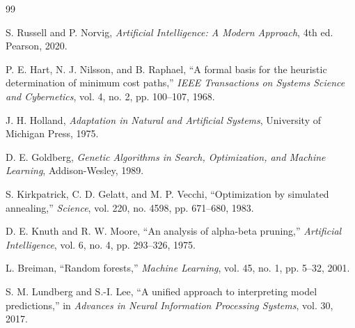\documentclass[12pt,a4paper]{article}
\begin{document}
\begin{thebibliography}{99}

S. Russell and P. Norvig,
\textit{Artificial Intelligence: A Modern Approach},
4th ed. Pearson, 2020.

P. E. Hart, N. J. Nilsson, and B. Raphael,
``A formal basis for the heuristic determination of minimum cost paths,''
\textit{IEEE Transactions on Systems Science and Cybernetics},
vol. 4, no. 2, pp. 100--107, 1968.

J. H. Holland,
\textit{Adaptation in Natural and Artificial Systems},
University of Michigan Press, 1975.

D. E. Goldberg,
\textit{Genetic Algorithms in Search, Optimization, and Machine Learning},
Addison-Wesley, 1989.

S. Kirkpatrick, C. D. Gelatt, and M. P. Vecchi,
``Optimization by simulated annealing,''
\textit{Science},
vol. 220, no. 4598, pp. 671--680, 1983.

D. E. Knuth and R. W. Moore,
``An analysis of alpha-beta pruning,''
\textit{Artificial Intelligence},
vol. 6, no. 4, pp. 293--326, 1975.

L. Breiman,
``Random forests,''
\textit{Machine Learning},
vol. 45, no. 1, pp. 5--32, 2001.

S. M. Lundberg and S.-I. Lee,
``A unified approach to interpreting model predictions,''
in \textit{Advances in Neural Information Processing Systems},
vol. 30, 2017.

\end{thebibliography}
\end{document}
